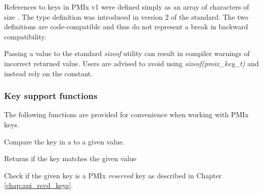 \adviceuserstart
References to keys in \ac{PMIx} v1 were defined simply as an array of characters of size . The  type definition was introduced in version 2 of the standard. The two definitions are code-compatible and thus do not represent a break in backward compatibility.

Passing a  value to the standard \textit{sizeof} utility can result in compiler warnings of incorrect returned value. Users are advised to avoid using \textit{sizeof(pmix_key_t)} and instead rely on the  constant.
\adviceuserend

\subsubsection{Key support functions}

The following functions are provided for convenience when working with \ac{PMIx} keys.


Compare the key in a  to a given value.


\begin{arglist}
\end{arglist}

Returns  if the key matches the given value


Check if the given key is a \ac{PMIx} \emph{reserved} key as described in Chapter \ref{chap:api_rsvd_keys}.


\begin{arglist}
\end{arglist}

